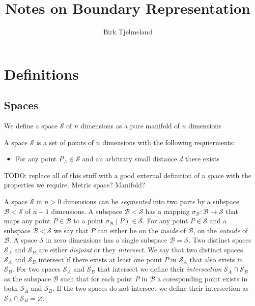 \documentclass[a4paper]{article}
\title{Notes on Boundary Representation}
\author{Birk Tjelmeland}
\theoremstyle{definition}
\begin{document}
\maketitle

\section{Definitions}

\subsection{Spaces}

We define a space $\mathcal{S}$ of $n$ dimensions as a pure manifold of $n$ dimensions 

A space $\mathcal{S}$ is a set of points of $n$ dimensions with the following requierments:
\begin{itemize}
    \item For any point $P_A \in \mathcal{S}$ and an arbitrary small distance $d$ there exists 
\end{itemize}

TODO: replace all of this stuff with a good external definition of a space with the properties we require.
Metric space? Manifold? 

A space $\mathcal{S}$ in $n > 0$ dimensions can be \emph{segmented} into two parts by a subspace $\mathcal{B} < \mathcal{S}$ of $n-1$ dimensions.
A subspace $\mathcal{B} < \mathcal{S}$ has a mapping $\sigma_\mathcal{B} : \mathcal{B} \rightarrow \mathcal{S}$ that maps any point $P \in \mathcal{B}$ to a point $\sigma_\mathcal{B}(P) \in \mathcal{S}$.
For any point $P \in \mathcal{S}$ and a subspace $\mathcal{B} < \mathcal{S}$ we say that $P$ can either be on the \emph{inside} of $\mathcal{B}$, on the \emph{outside} of $\mathcal{B}$.
A space $\mathcal{S}$ in zero dimensions has a single subspace $\mathcal{B} = \mathcal{S}$.
Two distinct spaces $\mathcal{S}_A$ and $\mathcal{S}_B$ are either \emph{disjoint} or they \emph{intersect}.
We say that two distinct spaces $\mathcal{S}_A$ and $\mathcal{S}_B$ intersect if there exists at least one point $P$ in $\mathcal{S}_A$ that also exists in $\mathcal{S}_B$.
For two spaces $\mathcal{S}_A$ and $\mathcal{S}_B$ that intersect we define their \emph{intersection} $\mathcal{S}_A \cap \mathcal{S}_B$ as the subspace $\mathcal{B}$ such that for each point $P$ in $\mathcal{B}$ a coresponding point exists in both $\mathcal{S}_A$ and $\mathcal{S}_B$.
If the two spaces do not intersect we define their intersection as $\mathcal{S}_A \cap \mathcal{S}_B = \varnothing$.
\end{document}
